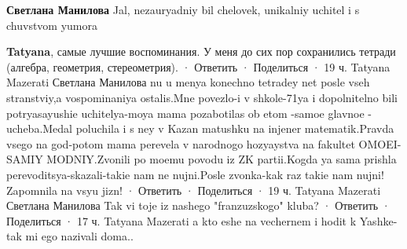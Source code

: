 \begin{itemize}
\begin{itemize}
\begin{itemize}
\textbf{Светлана Манилова} Jal, nezauryadniy bil chelovek, unikalniy uchitel i s chuvstvom yumora

\textbf{Tatyana}, самые лучшие воспоминания. У меня до сих пор сохранились тетради (алгебра, геометрия, стереометрия).
 · Ответить · Поделиться · 19 ч.
Tatyana Mazerati
Светлана Манилова nu u menya konechno tetradey net posle vseh stranstviy,a vospominaniya ostalis.Mne povezlo-i v shkole-71ya i dopolnitelno bili potryasayushie uchitelya-moya mama pozabotilas ob etom -samoe glavnoe -ucheba.Medal poluchila i s ney v Kazan matushku na injener matematik.Pravda vsego na god-potom mama perevela v narodnogo hozyaystva na fakultet OMOEI-SAMIY MODNIY.Zvonili po moemu povodu iz ZK partii.Kogda ya sama prishla perevoditsya-skazali-takie nam ne nujni.Posle zvonka-kak raz takie nam nujni! Zapomnila na vsyu jizn!
 · Ответить · Поделиться · 19 ч.
Tatyana Mazerati
Светлана Манилова Tak vi toje iz nashego "franzuzskogo" kluba?
 · Ответить · Поделиться · 17 ч.
Tatyana Mazerati
a kto eshe na vechernem i hodit k Yashke-tak mi ego nazivali doma..
\end{itemize} %

\end{itemize} %


\end{itemize} %

